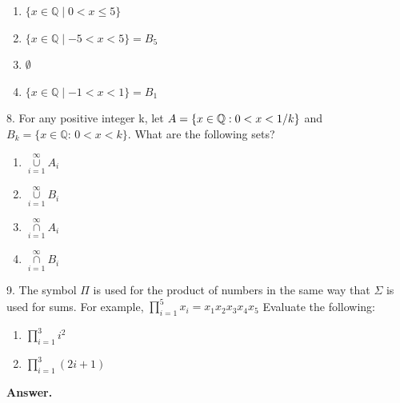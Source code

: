 \documentclass[10pt,]{book}
\theoremstyle{plain}
\theoremstyle{definition}
\theoremstyle{definition}
\theoremstyle{definition}
\theoremstyle{definition}
\begin{document}
\begin{exercisegroup}
\begin{multicols}{2}
\begin{enumerate}[label=\alph*]
\item\hypertarget{li-246}{} \(\{x\in \mathbb{Q}\mid 0 < x \leq 5\}\) %
\item\hypertarget{li-247}{} \(\{x\in \mathbb{Q}\mid -5 < x < 5\}=B_5\) %
\item\hypertarget{li-248}{}  \(\emptyset\)                %
\item\hypertarget{li-249}{} \(\{x\in \mathbb{Q}\mid -1 < x < 1\}=B_1\)%
\end{enumerate}
\end{multicols}
%
\item[8.]\hypertarget{exercise-39}{} For any positive integer k, let \(A = \{x \in \mathbb{Q}:\text0 < x < 1/k\}\) and \(B _k = \{x \in \mathbb{Q}:\,0 < x < k\}\). What
are the following sets? %
\par
\leavevmode%
\begin{multicols}{2}
\begin{enumerate}[label=\alph*]
\item\hypertarget{li-250}{}  \(\underset{i=1}{\overset{\infty }{\cup }}A_i\)%
\item\hypertarget{li-251}{}  \(\underset{i=1}{\overset{\infty }{\cup }}B_i\)%
\item\hypertarget{li-252}{}  \(\underset{i=1}{\overset{\infty }{\cap }}A_i\)%
\item\hypertarget{li-253}{}  \(\underset{i=1}{\overset{\infty }{\cap }}B_i\)%
\end{enumerate}
\end{multicols}
%
\par\smallskip
\item[9.]\hypertarget{exercise-40}{}The symbol \(\Pi\) is used for the product of numbers in the same way that \(\Sigma\) is used for sums. For example,
  \(\prod _{i=1}^5 x_i=x_1 x_2 x_3 x_4 x_5\)
Evaluate the following:%
\par
\leavevmode%
\begin{multicols}{2}
\begin{enumerate}[label=\alph*]
\item\hypertarget{li-254}{}  \(\prod _{i=1}^3 i^2\)%
\item\hypertarget{li-255}{}   \(\prod _{i=1}^3 (2i+1)\)%
\end{enumerate}
\end{multicols}
%
\par\smallskip
\par\smallskip
\noindent\textbf{Answer.}\hypertarget{answer-21}{}\quad

\end{exercisegroup}
\end{document}
